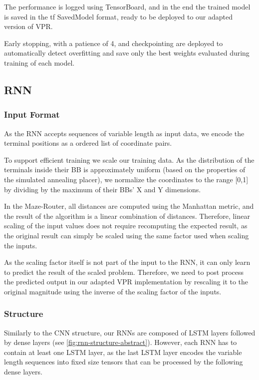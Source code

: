 The performance is logged using TensorBoard\cite{TODO}, and in the end the trained model is saved in the \gls{tf} SavedModel format\cite{TODO}, ready to be deployed to our adapted version of \gls{VPR}.

Early stopping, with a patience of 4, and checkpointing are deployed to automatically detect overfitting and save only the best weights evaluated during training of each model.

\subsection{\gls{RNN}}

\subsubsection{Input Format}

As the \gls{RNN} accepts sequences of variable length as input data, we encode the terminal positions as a ordered list of coordinate pairs.

To support efficient training we scale our training data. As the distribution of the terminals inside their \gls{BB} is approximately uniform (based on the properties of the simulated annealing placer), we normalize the coordinates to the range [0,1] by dividing by the maximum of their \glspl{BB}' X and Y dimensions. 

In the Maze-Router, all distances are computed using the Manhattan metric, and the result of the algorithm is a linear combination of distances. Therefore, linear scaling of the input values does not require recomputing the expected result, as the original result can simply be scaled using the same factor used when scaling the inputs.

As the scaling factor itself is not part of the input to the \gls{RNN}, it can only learn to predict the result of the scaled problem. Therefore, we need to post process the predicted output in our adapted \gls{VPR} implementation by rescaling it to the original magnitude using the inverse of the scaling factor of the inputs.

\subsubsection{Structure}\label{ch:rnn-design}

Similarly to the \gls{CNN} structure, our \glspl{RNN} are composed of \gls{LSTM} layers followed by dense layers (see \ref{fig:rnn-structure-abstract}). However, each \gls{RNN} has to contain at least one \gls{LSTM} layer, as the last \gls{LSTM} layer encodes the variable length sequences into fixed size tensors that can be processed by the following dense layers.

